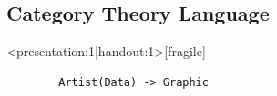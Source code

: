 \documentclass[xcolor={dvipsnames}]{beamer}
\begin{document}
\begin{frame}
{\begin{alertblock}{}
\begin{description}
        \end{description}    
    \end{alertblock}
    }
\end{frame}

\subsection{Category Theory Language}
\begin{frame}<presentation:1|handout:1>[fragile]{}
    \begin{verbatim}
        Artist(Data) -> Graphic
    \end{verbatim}
\end{frame}
\end{document}
